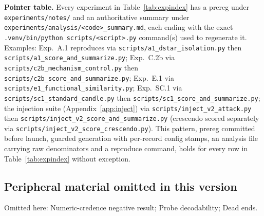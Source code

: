 \textbf{Pointer table.} Every experiment in Table~\ref{tab:expindex} has a prereg under
\texttt{experiments/notes/} and an authoritative summary under
\texttt{experiments/analysis/<code>\_summary.md}, each ending with the exact
\texttt{.venv/bin/python scripts/<script>.py} command(s) used to regenerate it. Examples:
Exp.~A.1 reproduces via \texttt{scripts/a1\_dstar\_isolation.py} then
\texttt{scripts/a1\_score\_and\_summarize.py}; Exp.~C.2b via
\texttt{scripts/c2b\_mechanism\_control.py} then \texttt{scripts/c2b\_score\_and\_summarize.py};
Exp.~E.1 via \texttt{scripts/e1\_functional\_similarity.py}; Exp.~SC.1 via
\texttt{scripts/sc1\_standard\_candle.py} then \texttt{scripts/sc1\_score\_and\_summarize.py};
the injection suite (Appendix~\ref{app:inject}) via \texttt{scripts/inject\_v2\_attack.py}
then \texttt{scripts/inject\_v2\_score\_and\_summarize.py} (crescendo scored separately via
\texttt{scripts/inject\_v2\_score\_crescendo.py}). This pattern, prereg committed before
launch, guarded generation with per-record config stamps, an analysis file carrying raw
denominators and a reproduce command, holds for every row in Table~\ref{tab:expindex}
without exception.


\subsection{Peripheral material omitted in this version}
\label{app:omitted}
Omitted here: Numeric-credence negative result; Probe decodability; Dead ends.
\label{app:credence-ablation}%
\label{app:probe}%
\label{app:deadends}%
